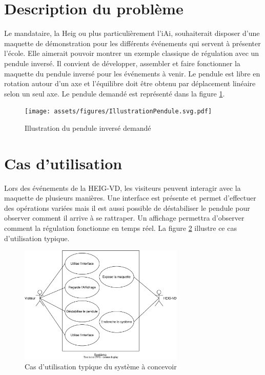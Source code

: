 \section{Description du problème}\label{sec:DescProb}
Le mandataire, la \acrshort{Heig} ou plus particulièrement l'\acrshort{iAi}, souhaiterait disposer d'une maquette de démonstration pour les différents événements qui servent à présenter l'école. Elle aimerait pouvoir montrer un exemple classique de régulation avec un pendule inversé.
Il convient de développer, assembler et faire fonctionner la maquette du pendule inversé pour les événements à venir. Le pendule est libre en rotation autour d'un axe et l'équilibre doit être obtenu par déplacement linéaire selon un seul axe. Le pendule demandé est représenté dans la figure \ref{fig:Illustration}.

\begin{figure}[H]
    \centering
    \texttt{[image: assets/figures/IllustrationPendule.svg.pdf]}
    \caption{Illustration du pendule inversé demandé}
    \label{fig:Illustration}
\end{figure}

\section{Cas d'utilisation}\label{sec:CasUtil}
Lors des événements de la HEIG-VD, les visiteurs peuvent interagir avec la maquette de plusieurs manières. Une interface est présente et permet
d'effectuer des opérations variées mais il est aussi possible de déstabiliser le pendule pour observer comment il arrive à se rattraper.
Un affichage permettra d'observer comment la régulation fonctionne en temps réel.
La figure \ref{fig:CasUtil} illustre ce cas d'utilisation typique.

\begin{figure}[H]
    \centering
    \includegraphics[width = 0.7\textwidth]{assets/figures/CasUtil.drawio.svg}
    \caption{Cas d'utilisation typique  du système à concevoir}
    \label{fig:CasUtil}
\end{figure}

